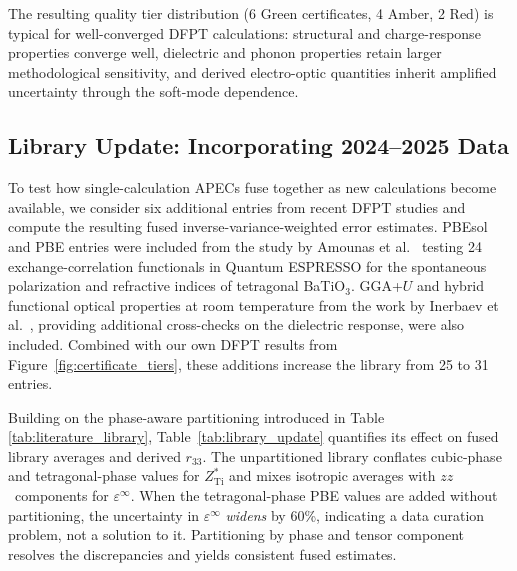 \documentclass[prb,twocolumn,superscriptaddress,amsmath,amssymb,longbibliography]{revtex4-2}
\begin{document}
The resulting quality tier 
distribution (6 Green certificates, 4 Amber, 2 Red) is typical for well-converged 
DFPT calculations: structural and charge-response properties converge well, 
dielectric and phonon properties retain larger methodological sensitivity,  and derived electro-optic quantities inherit amplified uncertainty through the soft-mode dependence. 

\subsection{Library Update: Incorporating 2024--2025 Data}
\label{sec:library_update}

To test how single-calculation APECs fuse together as new calculations become available, we consider six additional entries from recent DFPT studies and compute the resulting fused inverse-variance-weighted  error estimates.  
PBEsol and PBE entries were included from the study by Amounas et al.\ \cite{Amounas2024} testing 24 exchange-correlation functionals 
in Quantum ESPRESSO for the spontaneous polarization and refractive indices 
of tetragonal BaTiO$_3$. 
 GGA+$U$ 
and hybrid functional optical properties at room temperature from the work by  Inerbaev et al.\ \cite{Inerbaev2025}, providing 
additional cross-checks on the dielectric response, were also included. Combined with our own 
DFPT results from Figure~\ref{fig:certificate_tiers}, these additions 
increase the library from 25 to 31 entries.

Building on the phase-aware partitioning introduced in Table \ref{tab:literature_library}, Table~\ref{tab:library_update} quantifies its effect 
on fused library averages and derived $r_{33}$. The unpartitioned library 
conflates cubic-phase and tetragonal-phase values for 
$Z^*_{\mathrm{Ti}}$ and mixes isotropic averages with $zz$~components for 
$\varepsilon^\infty$. When the tetragonal-phase PBE values are added 
without partitioning, the uncertainty in $\varepsilon^\infty$  \emph{widens} 
by 60\%, indicating a data curation problem, not a solution to it. 
Partitioning by phase and tensor component resolves the discrepancies 
and yields consistent fused estimates.
\end{document}
